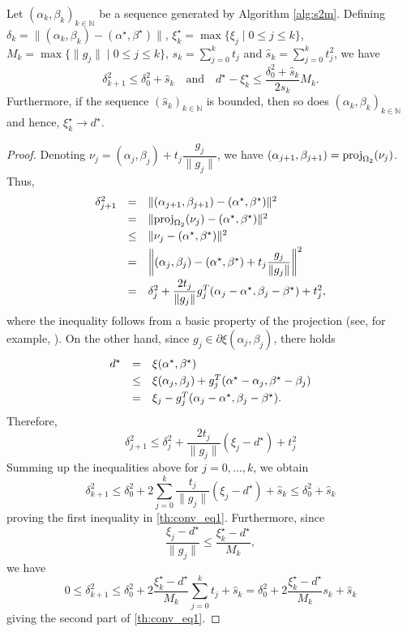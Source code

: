 \documentclass[smallextended,referee,envcountsect]{svjour3}
\newcommand{\N}{\mathbb{N}}
\begin{document}
\begin{theorem}
\label{th:conv}
Let $(\alpha_k,\beta_k)_{k\in\N}$ be a sequence generated by 
Algorithm \ref{alg:s2m}. Defining 
$\delta_k=\|(\alpha_k,\beta_k)-(\alpha^\star,\beta^\star)\|$, 
$\xi_k^\star=\max\{\xi_j\mid 0\leq j\leq k\}$, $M_k=\max\{\|g_j\|\mid 0\leq j\leq k\}$, 
$s_k=\sum\limits_{j=0}^{k}t_j$ and $\hat{s}_k=\sum\limits_{j=0}^{k}t_j^2$, we have 
\begin{equation}
\label{th:conv_eq1}
\delta_{k+1}^2\leq\delta_0^2+\hat{s}_k\quad\mbox{and}\quad
d^\star-\xi_k^\star\leq\dfrac{\delta_0^2+\hat{s}_k}{2s_k}M_k.
\end{equation}
Furthermore, if the sequence $(\hat{s}_k)_{k\in\N}$ is bounded, then so does 
$(\alpha_k,\beta_k)_{k\in\N}$ and hence, $\xi_k^\star\to d^\star$.
\end{theorem}
\begin{proof}
Denoting $\nu_j = (\alpha_j,\beta_j)+t_j\dfrac{g_j}{\|g_j\|}$, we have 
$(\alpha_{j+1},\beta_{j+1}) = {\rm proj}_{\Omega_2}(\nu_j)$. Thus, 
$$
\begin{array}{rcl}
\delta_{j+1}^2 & = & \|(\alpha_{j+1},\beta_{j+1})-(\alpha^\star,\beta^\star)\|^2 
\vspace{.1cm} \\ 
& = & \|{\rm proj}_{\Omega_2}(\nu_j)-(\alpha^\star,\beta^\star)\|^2
\vspace{.1cm} \\ 
& \leq & \|\nu_j-(\alpha^\star,\beta^\star)\|^2
\vspace{.1cm} \\ 
& = & \left\|(\alpha_j,\beta_j)-(\alpha^\star,\beta^\star)+t_j\dfrac{g_j}{\|g_j\|}\right\|^2
\vspace{.1cm} \\ 
& = & \delta_j^2 
+\dfrac{2t_j}{\|g_j\|}g_j^T(\alpha_j-\alpha^\star,\beta_j-\beta^\star)
+t_j^2,
\end{array}
$$
where the inequality follows from a basic property of the projection 
(see, for example, \cite[Lemma 3.1.5]{Nesterov04}). On the other hand, since 
$g_j\in\partial\xi(\alpha_j,\beta_j)$, there holds 
$$
\begin{array}{rcl}
d^\star & = & \xi(\alpha^\star,\beta^\star) 
\vspace{.1cm} \\ 
& \leq & \xi(\alpha_j,\beta_j) + g_j^T(\alpha^\star-\alpha_j,\beta^\star-\beta_j) 
\vspace{.1cm} \\ 
& = & \xi_j - g_j^T(\alpha_j-\alpha^\star,\beta_j-\beta^\star).
\end{array}
$$
Therefore, 
$$
\delta_{j+1}^2 \leq \delta_j^2 + \dfrac{2t_j}{\|g_j\|}(\xi_j-d^\star) + t_j^2
$$
Summing up the inequalities above for $j=0,\ldots,k$, we obtain 
$$
\delta_{k+1}^2\leq \delta_0^2+
2\sum\limits_{j=0}^k\dfrac{t_j}{\|g_j\|}(\xi_j-d^\star) + \hat{s}_k \leq 
\delta_0^2+\hat{s}_k
$$
proving the first inequality in \eqref{th:conv_eq1}. Furthermore, since 
$$
\dfrac{\xi_j-d^\star}{\|g_j\|} \leq \dfrac{\xi_k^\star-d^\star}{M_k},
$$
we have 
$$
0 \leq \delta_{k+1}^2 \leq 
\delta_0^2 + 2\dfrac{\xi_k^\star-d^\star}{M_k}\sum\limits_{j=0}^kt_j + \hat{s}_k = 
\delta_0^2 + 2\dfrac{\xi_k^\star-d^\star}{M_k}s_k + \hat{s}_k 
$$
giving the second part of \eqref{th:conv_eq1}. 


\end{proof}
\end{document}
